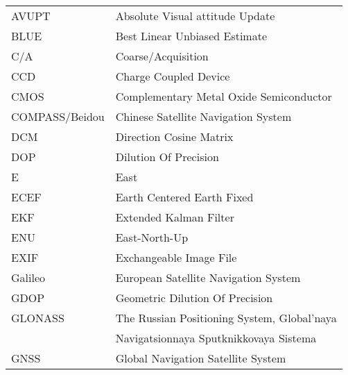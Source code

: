 \begin{tabular}{l@{\hspace{0.8cm}}l}
AVUPT & Absolute Visual attitude Update\\ [2.0ex]
BLUE & Best Linear Unbiased Estimate\\[2.0ex]
C/A & Coarse/Acquisition\\[2.0ex]
CCD & Charge Coupled Device\\[2.0ex]
CMOS & Complementary Metal Oxide Semiconductor\\[2.0ex]
COMPASS/Beidou & Chinese Satellite Navigation System\\[2.0ex]
DCM & Direction Cosine Matrix\\[2.0ex]
DOP & Dilution Of Precision\\[2.0ex]
E & East\\[2.0ex]
ECEF & Earth Centered Earth Fixed\\[2.0ex]
EKF & Extended Kalman Filter\\[2.0ex]
ENU & East-North-Up\\[2.0ex]
EXIF & Exchangeable Image File\\[2.0ex]
Galileo & European Satellite Navigation System\\[2.0ex]
GDOP & Geometric Dilution Of Precision\\[2.0ex]
GLONASS & The Russian Positioning System, Global'naya \\[0.5ex]
& Navigatsionnaya Sputknikkovaya Sistema\\[2.0ex]
GNSS & Global Navigation Satellite System\\[2.0ex]
\end{tabular}
\newpage
